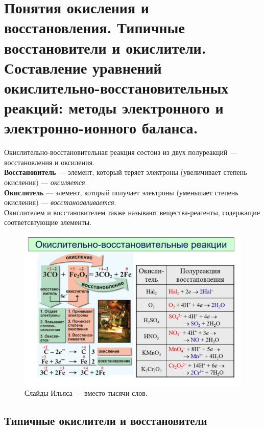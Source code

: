 
\section{Понятия окисления и восстановления. Типичные восстановители и окислители. Составление уравнений окислительно-восстановительных реакций: методы электронного и электронно-ионного баланса.}

Окислительно-восстановительная реакция состоиз из двух полуреакций --- восстановления и оксиления.\\

\textbf{Восстановитель} --- элемент, который теряет электроны (увеличивает степень окисления) --- \textit{оксиляется}.\\

\textbf{Окислитель} --- элемент, который получает электроны (уменьшает степень окисления) --- \textit{восстаноавливается}.\\

Окислителем и восстановителем также называют вещества-реагенты, содержащие соответсвтующие элементы.

\begin{figure}[H]
	\centering
	\includegraphics[width=\linewidth]{Pictures/Il1.jpg}
	\caption{Слайды Ильяса --- вместо тысячи слов.}
	\label{fig:Il1}
\end{figure}

\subsection{Типичные окислители и восстановители}

